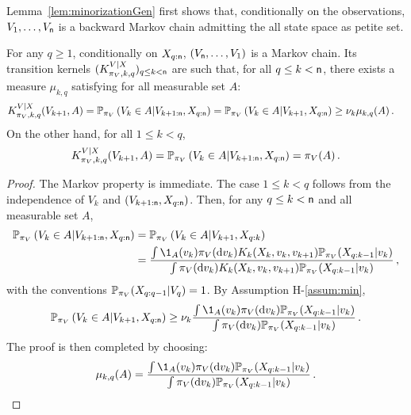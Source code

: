 Lemma~\ref{lem:minorizationGen} first shows that, conditionally on the observations, $V_1,\ldots,V_{{\mathsf n}}$ is a backward Markov chain admitting the all state space as petite set.
\begin{lemma}
\label{lem:minorizationGen}
For any $q\ge 1$, conditionally on $X_{q:{\mathsf n}}$, $(V_{{\mathsf n}},\ldots,V_1)$ is a Markov chain. Its transition kernels $(K^{V|X}_{\pi_V,k,q})_{q\le k <{\mathsf n}}$ are such that, for all $q\le k < {\mathsf n}$, there exists a measure $\mu_{k,q}$ satisfying for all measurable set $A$:
\begin{align*}
K^{V|X}_{\pi_V,k,q}(V_{k+1},A) = \mathbb{P}_{\pi_V}\left(V_{k}\in A\middle|V_{k+1:{\mathsf n}},X_{q:{\mathsf n}}\right)  &= \mathbb{P}_{\pi_V}\left(V_{k}\in A\middle|V_{k+1},X_{q:{\mathsf n}}\right)\ge \nu_k \mu_{k,q}(A)\,.
\end{align*}
On the other hand, for all $1\le k <q$,
\[
K^{V|X}_{\pi_V,k,q}(V_{k+1},A) = \mathbb{P}_{\pi_V}\left(V_{k}\in A\middle|V_{k+1:{\mathsf n}},X_{q:{\mathsf n}}\right) = \pi_V(A)\,.
\]
\end{lemma}
\begin{proof}
The Markov property is immediate. The case $1\le k <q$ follows from the independence of $V_k$ and $(V_{k+1:{\mathsf n}},X_{q:{\mathsf n}})$. Then, for any $q\le k < {\mathsf n}$ and all measurable set $A$,
\begin{align*}
\bP_{\pi_V}\pa{V_{k}\in A\middle|V_{k+1:\nobs},X_{q:\nobs}} &= \bP_{\pi_V}\pa{V_{k}\in A\middle|V_{k+1},X_{q:k}}\\
&= \frac{\int \1_{A}(v_{k})\pi_V(\rmd v_{k})K_k(X_{k},v_{k},v_{k+1})\bP_{\pi_V}(X_{q:k-1}|v_{k})}{\int \pi_V(\rmd v_{k})K_k(X_{k},v_{k},v_{k+1})\bP_{\pi_V}(X_{q:k-1}|v_{k})}\eqsp,
\end{align*}
with the conventions $\mathbb{P}_{\pi_V}(X_{q:q-1}|V_{q})=1$. By Assumption H-\ref{assum:min},
\[
\bP_{\pi_V}\pa{V_{k}\in A\middle|V_{k+1},X_{q:\nobs}}
\ge \nu_k\frac{\int \1_{A}(v_{k})\pi_V(\rmd v_{k})\bP_{\pi_V}(X_{q:k-1}|v_{k})}{\int \pi_V(\rmd v_{k})\bP_{\pi_V}(X_{q:k-1}|v_{k})}\eqsp. 
\]
The proof is then completed by choosing:
\[
\mu_{k,q}(A) = \frac{\int \1_{A}(v_{k})\pi_V(\rmd v_{k})\bP_{\pi_V}(X_{q:k-1}|v_{k})}{\int \pi_V(\rmd v_{k})\bP_{\pi_V}(X_{q:k-1}|v_{k})}\eqsp. 
\]
\end{proof}


